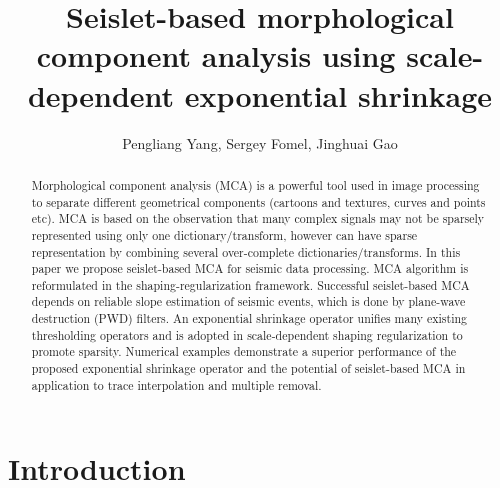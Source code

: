 \title{Seislet-based morphological component analysis using scale-dependent exponential shrinkage}

\renewcommand{\thefootnote}{\fnsymbol{footnote}}

\author{Pengliang Yang\footnotemark[1], Sergey Fomel\footnotemark[2], Jinghuai Gao\footnotemark[1]}

\address{
\footnotemark[1] Xi'an Jiaotong University\\
National Engineering Laboratory for Offshore Oil Exploration\\
Xi'an, China, 710049\\
\footnotemark[2] Bureau of Economic Geology,\\
John A. and Katherine G. Jackson School of Geosciences \\
The University of Texas at Austin \\
University Station, Box X \\
Austin, TX, USA, 78713-8924}



\maketitle

\begin{abstract}
Morphological component analysis (MCA) is a powerful tool used in image processing to separate different geometrical components (cartoons and textures, curves and points etc). MCA is based on the observation that many complex signals may not be sparsely represented using only one dictionary/transform, however can have sparse representation by combining several over-complete dictionaries/transforms. In this paper we propose seislet-based MCA for seismic data processing. MCA algorithm is reformulated in the shaping-regularization framework. Successful seislet-based MCA depends on reliable slope estimation of seismic events, which is done by plane-wave destruction (PWD) filters. An exponential shrinkage operator unifies many existing thresholding operators and is adopted in scale-dependent shaping regularization to promote sparsity. Numerical examples demonstrate a superior performance of the proposed exponential shrinkage operator and the potential of seislet-based MCA in application to trace interpolation and multiple removal.
\end{abstract}


\section{Introduction}

